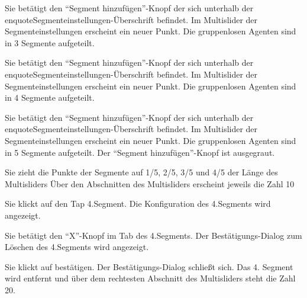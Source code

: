 \documentclass[parskip=full,11pt]{scrartcl}
\begin{document}
{Sie betätigt den \enquote{Segment hinzufügen}-Knopf der sich unterhalb der enquote{Segmenteinstellungen}-Überschrift befindet.}
{Im Multislider der Segmenteinstellungen erscheint ein neuer Punkt. Die gruppenlosen Agenten sind in 3 Segmente aufgeteilt.}

{Sie betätigt den \enquote{Segment hinzufügen}-Knopf der sich unterhalb der enquote{Segmenteinstellungen}-Überschrift befindet.}
{Im Multislider der Segmenteinstellungen erscheint ein neuer Punkt. Die gruppenlosen Agenten sind in 4 Segmente aufgeteilt.}

{Sie betätigt den \enquote{Segment hinzufügen}-Knopf der sich unterhalb der enquote{Segmenteinstellungen}-Überschrift befindet.}
{Im Multislider der Segmenteinstellungen erscheint ein neuer Punkt. Die gruppenlosen Agenten sind in 5 Segmente aufgeteilt. Der \enquote{Segment hinzufügen}-Knopf ist ausgegraut.}

{Sie zieht die Punkte der Segmente auf 1/5, 2/5, 3/5 und 4/5 der Länge des Multisliders}
{Über den Abschnitten des Multisliders erscheint jeweils die Zahl 10}

{Sie klickt auf den Tap 4.Segment.}
{Die Konfiguration des 4.Segments wird angezeigt.}

{Sie betätigt den \enquote{X}-Knopf im Tab des 4.Segments.}
{Der Bestätigungs-Dialog zum Löschen des 4.Segments wird angezeigt.}

{Sie klickt auf bestätigen.}
{Der Bestätigungs-Dialog schließt sich. Das 4. Segment wird entfernt und über dem rechtesten Abschnitt des Multisliders steht die Zahl 20.}
\end{document}
